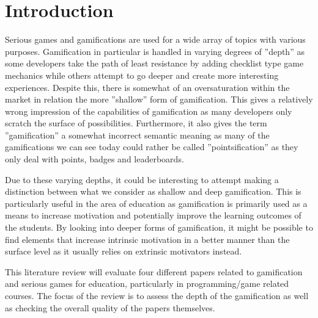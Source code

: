 \section{Introduction}
Serious games and gamifications are used for a wide array of topics with various purposes. Gamification in particular is handled in varying degrees of ''depth'' as some developers take the path of least resistance by adding checklist type game mechanics while others attempt to go deeper and create more interesting experiences. Despite this, there is somewhat of an oversaturation within the market in relation the more ''shallow'' form of gamification. This gives a relatively wrong impression of the capabilities of gamification as many developers only scratch the surface of possibilities. Furthermore, it also gives the term ''gamification'' a somewhat incorrect semantic meaning as many of the gamifications we can see today could rather be called ''pointsification'' as they only deal with points, badges and leaderboards. 

Due to these varying depths, it could be interesting to attempt making a distinction between what we consider as shallow and deep gamification. This is particularly useful in the area of education as gamification is primarily used as a means to increase motivation and potentially improve the learning outcomes of the students. By looking into deeper forms of gamification, it might be possible to find elements that increase intrinsic motivation in a better manner than the surface level as it usually relies on extrinsic motivators instead. 


This literature review will evaluate four different papers related to gamification and serious games for education, particularly in programming/game related courses. The focus of the review is to assess the depth of the gamification as well as checking the overall quality of the papers themselves. 